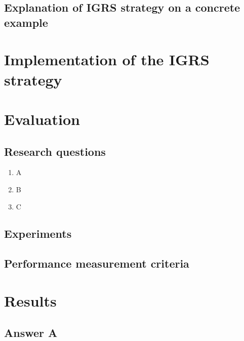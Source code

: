 

\subsection{Explanation of IGRS strategy on a concrete example}



\section{Implementation of the IGRS strategy} \label{sec:imp}




\section{Evaluation}\label{sec:eval}

\subsection{Research questions}
\begin{enumerate}
\item A
\item B
\item C
\end{enumerate}



\subsection{Experiments}


\subsection{Performance measurement criteria}

\section{Results}  \label{sec:res}

\subsection{Answer A}

